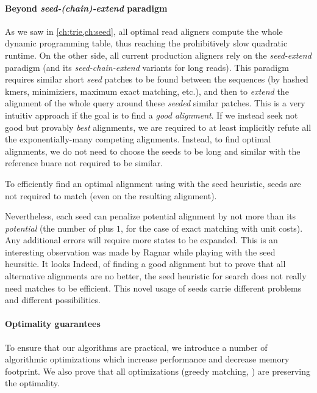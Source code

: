 \paragraph{Beyond \emph{seed-(chain)-extend} paradigm}

As we saw in \cref{ch:trie,ch:seed}, all optimal read aligners compute the whole
dynamic programming table, thus reaching the prohibitively slow quadratic
runtime. On the other side, all current production aligners rely on the
\emph{seed-extend} paradigm (and its \emph{seed-chain-extend} variants for long
reads).
%
This paradigm requires similar short \emph{seed} patches to be found
between the sequences (\AG by hashed kmers, minimiziers, maximum exact matching,
etc.), and then to \emph{extend} the alignment of the whole query around these
\emph{seeded} similar patches. This is a very intuitiv approach if the goal is
to find a \emph{good alignment}.
%
If we instead seek not good but provably \emph{best} alignments, we are required
to at least implicitly refute all the exponentially-many competing alignments.
%
Instead, to find optimal alignments, we do not need to choose the seeds to be
long and similar with the reference buare not required to be similar.
%
\begin{observation}
    To efficiently find an optimal alignment using \A with the seed heuristic,
    seeds are not required to match (even on the resulting alignment).
\end{observation}
%
Nevertheless, each seed can penalize potential alignment by not more than its
\emph{potential} (\ie the number of plus $1$, for the case of exact matching
with unit costs). Any additional errors will require more states to be expanded.
%
This is an interesting observation was made by Ragnar while playing with the
seed heursitic. It looks Indeed, of finding a good alignment but to prove that all
alternative alignments are no better, the seed heuristic for \A search does not
really need matches to be efficient.
%
This novel usage of seeds carrie different problems and different possibilities.

\paragraph{Optimality guarantees}
To ensure that our algorithms are practical, we introduce a number of
algorithmic optimizations which increase performance and decrease memory
footprint.
%
We also prove that all optimizations (greedy matching, ) are preserving the optimality.

